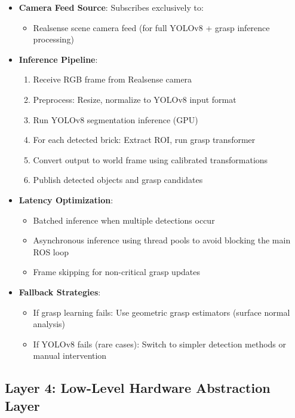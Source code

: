 \begin{itemize}
    \item \textbf{Camera Feed Source}: Subscribes exclusively to:
    \begin{itemize}
        \item Realsense scene camera feed (for full YOLOv8 + grasp inference processing)
    \end{itemize}
        
    \item \textbf{Inference Pipeline}: 
    \begin{enumerate}
        \item Receive RGB frame from Realsense camera
        \item Preprocess: Resize, normalize to YOLOv8 input format
        \item Run YOLOv8 segmentation inference (GPU)
        \item For each detected brick: Extract ROI, run grasp transformer
        \item Convert output to world frame using calibrated transformations
        \item Publish detected objects and grasp candidates
    \end{enumerate}
    
    \item \textbf{Latency Optimization}: 
    \begin{itemize}
        \item Batched inference when multiple detections occur
        \item Asynchronous inference using thread pools to avoid blocking the main ROS loop
        \item Frame skipping for non-critical grasp updates
    \end{itemize}
    
    \item \textbf{Fallback Strategies}: 
    \begin{itemize}
        \item If grasp learning fails: Use geometric grasp estimators (surface normal analysis)
        \item If YOLOv8 fails (rare cases): Switch to simpler detection methods or manual intervention
    \end{itemize}
\end{itemize}

\subsection{Layer 4: Low-Level Hardware Abstraction Layer}
\label{subsec:hardware_abstraction_layer}

